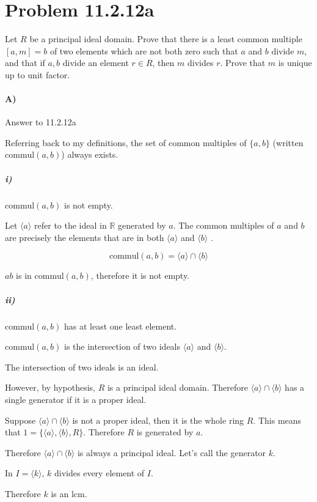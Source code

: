 \documentclass[10pt,letter]{article}
\begin{document}
\section*{Problem 11.2.12a}

Let $R$ be a principal ideal domain. Prove that there is a least common multiple $[a,m]=b$ of two elements which are not
both zero such that $a$ and $b$ divide $m$, and that if $a, b$ divide an element $r \in R$, then $m$ divides $r$. Prove that $m$ is unique
up to unit factor.

\paragraph{A)} Answer to 11.2.12a

Referring back to my definitions, the set of common multiples of $\{a, b\}$ (written $\text{commul}(a,b)$) always exists.

\subparagraph{i)} $\text{commul}(a, b)$ is not empty.

Let $\langle a \rangle$ refer to the ideal in $\mathbb{R}$ generated by $a$. The common multiples of $a$ and $b$ are
precisely the elements that are in both $\langle a \rangle$ and $\langle b \rangle$ .

$$ \text{commul}(a, b) = \langle a \rangle \cap \langle b \rangle $$

$ab$ is in $\text{commul}(a, b)$, therefore it is not empty.

\subparagraph{ii)} $\text{commul}(a, b)$ has at least one least element.

$\text{commul}(a, b)$ is the intersection of two ideals $\langle a \rangle$ and $\langle b \rangle$.

The intersection of two ideals is an ideal.

However, by hypothesis, $R$ is a principal ideal domain. Therefore $\langle a \rangle \cap \langle b \rangle$ has a single generator if it is a proper ideal.

Suppose $\langle a \rangle \cap \langle b \rangle$ is not a proper ideal, then it is the whole ring $R$. This means that $1 = \{ \langle a \rangle, \langle b \rangle, R \}$.
Therefore $R$ is generated by $a$.

Therefore $\langle a \rangle \cap \langle b \rangle$ is always a principal ideal. Let's call the generator $k$.

In $I = \langle k \rangle$, $k$ divides every element of $I$.

Therefore $k$ is an lcm.
\end{document}
